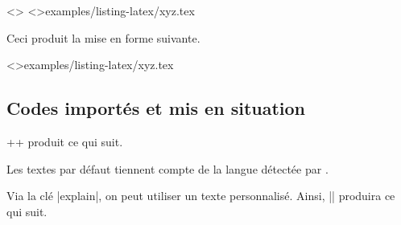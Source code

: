 \documentclass{../main/main}
\begin{document}
\begin{tdocexa}[Personnaliser]
    \leavevmode

    \begin{tdoclatex}<>
\tdoclatexinput[style=igor, showspaces]<>{examples/listing-latex/xyz.tex}
    \end{tdoclatex}

    Ceci produit la mise en forme suivante.

	\tdoclatexinput[style = igor, showspaces]<>{examples/listing-latex/xyz.tex}
\end{tdocexa}



\subsection{Codes importés et mis en situation}
\label{tutodoc-listing-latexshow}

\begin{tdocexa}
    \tdoclatexin++ produit ce qui suit.

    \medskip

    \begin{tdocshowcaseDOC}
    \end{tdocshowcaseDOC}
\end{tdocexa}


\begin{tdocnote}
    Les textes par défaut tiennent compte de la langue détectée par \thisproj.
\end{tdocnote}


\begin{tdocexa}
    Via la clé \tdoclatexin|explain|, on peut utiliser un texte personnalisé. Ainsi, \tdoclatexin|| produira ce qui suit.

    \medskip

    \begin{tdocshowcaseDOC}
    \end{tdocshowcaseDOC}
\end{tdocexa}
\end{document}
